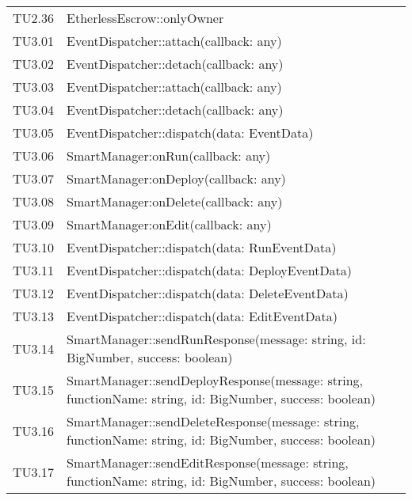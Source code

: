\begin{longtable}{
		>{\centering}p{}
		>{\centering\arraybackslash}p{}}
	TU2.36 &  EtherlessEscrow::onlyOwner  \tabularnewline
	
	TU3.01 & EventDispatcher::attach(callback: any) \\
	
	TU3.02 & EventDispatcher::detach(callback: any) \\
	
	TU3.03 & EventDispatcher::attach(callback: any) \\
	
	TU3.04 & EventDispatcher::detach(callback: any) \\
	
	TU3.05 & EventDispatcher::dispatch(data: EventData) \\
	
	TU3.06 & SmartManager:onRun(callback: any) \\
	
	TU3.07 & SmartManager:onDeploy(callback: any) \\
	
	TU3.08 & SmartManager:onDelete(callback: any) \\
	
	TU3.09 & SmartManager:onEdit(callback: any) \\
	
	TU3.10 & EventDispatcher::dispatch(data: RunEventData) \\
	
	TU3.11 & EventDispatcher::dispatch(data: DeployEventData) \\
	
	TU3.12 & EventDispatcher::dispatch(data: DeleteEventData) \\
	
	TU3.13 & EventDispatcher::dispatch(data: EditEventData) \\
	
	TU3.14 & SmartManager::sendRunResponse(message: string, id: BigNumber, success: boolean) \\
	
	TU3.15 & SmartManager::sendDeployResponse(message: string, functionName: string, id: BigNumber, success: boolean) \\
	
	TU3.16 & SmartManager::sendDeleteResponse(message: string, functionName: string, id: BigNumber, success: boolean) \\
	
	TU3.17 & SmartManager::sendEditResponse(message: string, functionName: string, id: BigNumber, success: boolean) \\
	

\end{longtable}
